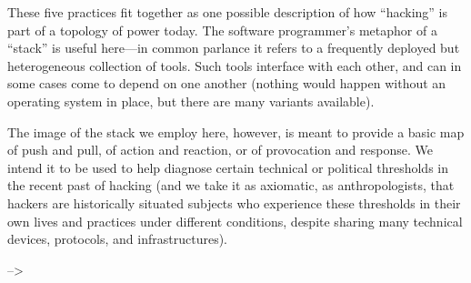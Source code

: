 \documentclass[10pt,letter,oneside]{scrartcl}
\begin{document}
These five practices fit together as one possible description of how ``hacking''
is part of a topology of power today.  The software programmer's metaphor
of a ``stack'' is useful here---in common parlance it refers to a frequently
deployed but heterogeneous collection of tools.  Such tools interface with each
other, and can in some cases come to depend on one another (nothing would happen
without an operating system in place, but there are many variants available).

The image of the stack we employ here, however, is meant to provide a basic map
of push and pull, of action and reaction, or of provocation and response.  We
intend it to be used to help diagnose certain technical or political thresholds
in the recent past of hacking (and we take it as axiomatic, as anthropologists, that
hackers are historically situated subjects who experience these thresholds in
their own lives and practices under different conditions, despite sharing many
technical devices, protocols, and infrastructures).   

--> 
\end{document}
